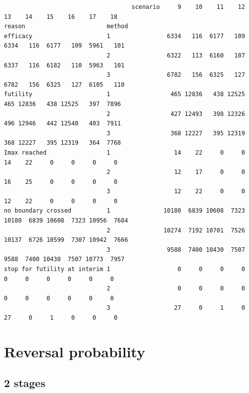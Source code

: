 \documentclass[12pt]{article}
\begin{document}
\begin{verbatim}
                                    scenario     9    10    11    12    13    14    15    16    17    18
reason                       method                                                                     
efficacy                     1                6334   116  6177   109  6334   116  6177   109  5961   101
                             2                6322   113  6160   107  6337   116  6182   110  5963   101
                             3                6782   156  6325   127  6782   156  6325   127  6105   110
futility                     1                 465 12836   438 12525   465 12836   438 12525   397  7896
                             2                 427 12493   398 12326   496 12946   442 12540   403  7911
                             3                 368 12227   395 12319   368 12227   395 12319   364  7768
Imax reached                 1                  14    22     0     0    14    22     0     0     0     0
                             2                  12    17     0     0    16    25     0     0     0     0
                             3                  12    22     0     0    12    22     0     0     0     0
no boundary crossed          1               10180  6839 10608  7323 10180  6839 10608  7323 10956  7684
                             2               10274  7192 10701  7526 10137  6726 10599  7307 10942  7666
                             3                9588  7400 10430  7507  9588  7400 10430  7507 10773  7957
stop for futility at interim 1                   0     0     0     0     0     0     0     0     0     0
                             2                   0     0     0     0     0     0     0     0     0     0
                             3                  27     0     1     0    27     0     1     0     0     0
\end{verbatim}

\clearpage

\section{Reversal probability}
\label{sec:orgeb5097b}

\subsection{2 stages}
\label{sec:orgfa886ed}
\end{document}
